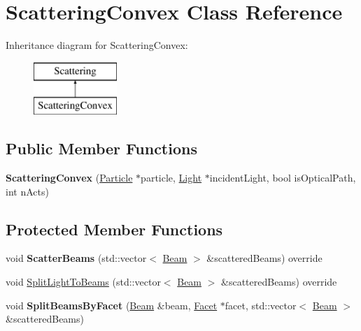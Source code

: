 \hypertarget{class_scattering_convex}{}\section{Scattering\+Convex Class Reference}
\label{class_scattering_convex}
Inheritance diagram for Scattering\+Convex\+:\begin{figure}[H]
\begin{center}
\leavevmode
\includegraphics[height=2.000000cm]{class_scattering_convex}
\end{center}
\end{figure}
\subsection*{Public Member Functions}
\begin{DoxyCompactItemize}
\item 
\mbox{\label{class_scattering_convex_a9adedd65ccc3aff302db10a7609d6b18}} 
{\bfseries Scattering\+Convex} (\mbox{\hyperlink{class_particle}{Particle}} $\ast$particle, \mbox{\hyperlink{class_light}{Light}} $\ast$incident\+Light, bool is\+Optical\+Path, int n\+Acts)
\end{DoxyCompactItemize}
\subsection*{Protected Member Functions}
\begin{DoxyCompactItemize}
\item 
\mbox{\label{class_scattering_convex_a9f7ef5a3606a49f8be327cb966d217bb}} 
void {\bfseries Scatter\+Beams} (std\+::vector$<$ \mbox{\hyperlink{class_beam}{Beam}} $>$ \&scattered\+Beams) override
\item 
void \mbox{\hyperlink{class_scattering_convex_acb8aa7121ffd9dfb7bf1d51a0d68e93a}{Split\+Light\+To\+Beams}} (std\+::vector$<$ \mbox{\hyperlink{class_beam}{Beam}} $>$ \&scattered\+Beams) override
\item 
\mbox{\label{class_scattering_convex_a4a2db66ffa5fa5c9190bd1f509ff02cc}} 
void {\bfseries Split\+Beams\+By\+Facet} (\mbox{\hyperlink{class_beam}{Beam}} \&beam, \mbox{\hyperlink{class_facet}{Facet}} $\ast$facet, std\+::vector$<$ \mbox{\hyperlink{class_beam}{Beam}} $>$ \&scattered\+Beams)
\end{DoxyCompactItemize}
